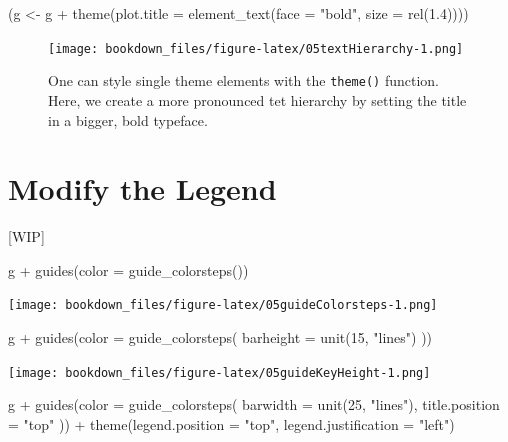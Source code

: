 \documentclass[
]{krantz}
\makeatletter
\newenvironment{Shaded}{\begin{snugshade}}{\end{snugshade}}
\newcommand{\AttributeTok}[1]{\textcolor[rgb]{0.61,0.61,0.61}{#1}}
\newcommand{\DecValTok}[1]{\textcolor[rgb]{0.06,0.06,0.06}{#1}}
\newcommand{\FloatTok}[1]{\textcolor[rgb]{0.06,0.06,0.06}{#1}}
\newcommand{\FunctionTok}[1]{\textcolor[rgb]{0,0,0}{#1}}
\newcommand{\NormalTok}[1]{#1}
\newcommand{\OtherTok}[1]{\textcolor[rgb]{0.37,0.37,0.37}{#1}}
\newcommand{\SpecialCharTok}[1]{\textcolor[rgb]{0,0,0}{#1}}
\newcommand{\StringTok}[1]{\textcolor[rgb]{0.5,0.5,0.5}{#1}}
\newenvironment{kframe}{%
\medskip{}
\setlength{\fboxsep}{.8em}
 \def\at@end@of@kframe{}%
 \ifinner\ifhmode%
  \def\at@end@of@kframe{\end{minipage}}%
  \begin{minipage}{\columnwidth}%
 \fi\fi%
 \def\FrameCommand##1{\hskip\@totalleftmargin \hskip-\fboxsep
 \colorbox{shadecolor}{##1}\hskip-\fboxsep
     \hskip-\linewidth \hskip-\@totalleftmargin \hskip\columnwidth}%
 \MakeFramed {\advance\hsize-\width
   \@totalleftmargin\z@ \linewidth\hsize
   \@setminipage}}%
 {\par\unskip\endMakeFramed%
 \at@end@of@kframe}
\renewenvironment{Shaded}{\begin{kframe}}{\end{kframe}}
\makeatother
\begin{document}
\begin{Shaded}
\begin{Highlighting}[]
\NormalTok{(g }\OtherTok{\textless{}{-}}\NormalTok{ g }\SpecialCharTok{+} \FunctionTok{theme}\NormalTok{(}\AttributeTok{plot.title =} \FunctionTok{element\_text}\NormalTok{(}\AttributeTok{face =} \StringTok{"bold"}\NormalTok{, }\AttributeTok{size =} \FunctionTok{rel}\NormalTok{(}\FloatTok{1.4}\NormalTok{))))}
\end{Highlighting}
\end{Shaded}

\begin{figure}
\centering
\texttt{[image: bookdown\_files/figure-latex/05textHierarchy-1.png]}
\caption{\label{fig:05textHierarchy}One can style single theme elements with the \texttt{theme()} function. Here, we create a more pronounced tet hierarchy by setting the title in a bigger, bold typeface.}
\end{figure}

\hypertarget{modify-the-legend}{%
\section{Modify the Legend}\label{modify-the-legend}}

{[}WIP{]}

\begin{Shaded}
\begin{Highlighting}[]
\NormalTok{g }\SpecialCharTok{+} \FunctionTok{guides}\NormalTok{(}\AttributeTok{color =} \FunctionTok{guide\_colorsteps}\NormalTok{())}
\end{Highlighting}
\end{Shaded}

\texttt{[image: bookdown\_files/figure-latex/05guideColorsteps-1.png]}

\begin{Shaded}
\begin{Highlighting}[]
\NormalTok{g }\SpecialCharTok{+} \FunctionTok{guides}\NormalTok{(}\AttributeTok{color =} \FunctionTok{guide\_colorsteps}\NormalTok{(}
    \AttributeTok{barheight =} \FunctionTok{unit}\NormalTok{(}\DecValTok{15}\NormalTok{, }\StringTok{"lines"}\NormalTok{)}
\NormalTok{  ))}
\end{Highlighting}
\end{Shaded}

\texttt{[image: bookdown\_files/figure-latex/05guideKeyHeight-1.png]}

\begin{Shaded}
\begin{Highlighting}[]
\NormalTok{g }\SpecialCharTok{+} \FunctionTok{guides}\NormalTok{(}\AttributeTok{color =} \FunctionTok{guide\_colorsteps}\NormalTok{(}
    \AttributeTok{barwidth =} \FunctionTok{unit}\NormalTok{(}\DecValTok{25}\NormalTok{, }\StringTok{"lines"}\NormalTok{), }\AttributeTok{title.position =} \StringTok{"top"}
\NormalTok{  )) }\SpecialCharTok{+}
  \FunctionTok{theme}\NormalTok{(}\AttributeTok{legend.position =} \StringTok{"top"}\NormalTok{, }\AttributeTok{legend.justification =} \StringTok{"left"}\NormalTok{)}
\end{Highlighting}
\end{Shaded}
\end{document}
